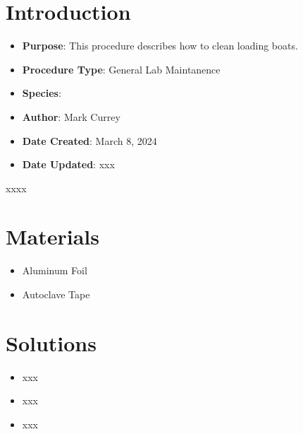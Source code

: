 \documentclass[
  letterpaper,
  DIV=11,
  numbers=noendperiod]{scrreprt}
\providecommand{\tightlist}{%
  \setlength{\itemsep}{0pt}\setlength{\parskip}{0pt}}\usepackage{longtable,booktabs,array}
\begin{document}
\hypertarget{introduction-5}{%
\section{Introduction}\label{introduction-5}}

\begin{itemize}
\item
  \textbf{Purpose}: This procedure describes how to clean loading boats.
\item
  \textbf{Procedure Type}: General Lab Maintanence
\item
  \textbf{Species}:
\item
  \textbf{Author}: Mark Currey
\item
  \textbf{Date Created}: March 8, 2024
\item
  \textbf{Date Updated}: xxx
\end{itemize}

\begin{tcolorbox}[enhanced jigsaw, toprule=.15mm, breakable, coltitle=black, leftrule=.75mm, title=\textcolor{quarto-callout-warning-color}{\faExclamationTriangle}\hspace{0.5em}{NOTES}, bottomrule=.15mm, toptitle=1mm, bottomtitle=1mm, colframe=quarto-callout-warning-color-frame, opacityback=0, colback=white, opacitybacktitle=0.6, colbacktitle=quarto-callout-warning-color!10!white, rightrule=.15mm, titlerule=0mm, arc=.35mm, left=2mm]

xxxx

\end{tcolorbox}

\hypertarget{materials-5}{%
\section{Materials}\label{materials-5}}

\begin{itemize}
\tightlist
\item
  Aluminum Foil
\item
  Autoclave Tape
\end{itemize}

\hypertarget{solutions-5}{%
\section{Solutions}\label{solutions-5}}

\begin{itemize}
\tightlist
\item
  xxx
\item
  xxx
\item
  xxx
\end{itemize}
\end{document}
